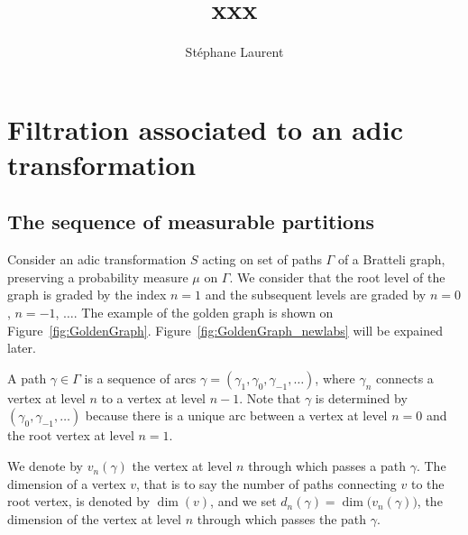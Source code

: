 \documentclass[12pt,a4paper]{article}
\author{Stéphane Laurent}
\title{xxx}
\begin{document}
\theoremstyle{defstyle}
\newtheorem{definition}{Definition}
\newtheorem{remark}{Remark}    
\theoremstyle{thmstyle}
\newtheorem{thm}{Theorem}[section]
\newtheorem{ppsition}{Proposition}
\newtheorem{lemma}{Lemma}

\newcommand{\FF}{\mathcal{F}}
\newcommand{\GG}{\mathcal{G}}
\newcommand{\EE}{\mathbb{E}}
\newcommand{\II}{\mathcal{I}}
\newcommand{\LL}{\mathcal{L}}
\newcommand{\OO}{\mathcal{O}}
\newcommand{\XX}{\mathcal{X}}
\newcommand{\given}{\mid}
\newcommand{\eps}{\epsilon}
\newcommand{\indic}{\boldsymbol 1}
\newcommand{\Vb}{\boldsymbol V}


\maketitle

\section{Filtration associated to an adic transformation} 

\subsection{The sequence of measurable partitions}

Consider an adic transformation $S$ acting on set of paths $\Gamma$ of a 
Bratteli graph, preserving a probability measure $\mu$ on $\Gamma$. 
We consider that the root level of the graph is graded by the index 
$n=1$ and the subsequent levels are graded by $n=0$, $n=-1$, $\ldots$. 
The example of the golden graph is shown on Figure~\ref{fig:GoldenGraph}. 
Figure~\ref{fig:GoldenGraph_newlabs} will be expained later.

A path $\gamma \in \Gamma$ is a sequence of arcs 
$\gamma=(\gamma_{1}, \gamma_0, \gamma_{-1}, \ldots)$, where $\gamma_n$ connects 
a vertex at level $n$ to a vertex at level $n-1$. 
Note that $\gamma$ is determined by $(\gamma_0, \gamma_{-1}, \ldots)$ 
because there is a unique arc between a vertex at level $n=0$ and the root vertex 
at level $n=1$.  

We denote by $v_n(\gamma)$ the vertex at level $n$ through which passes a path $\gamma$. 
The dimension of a vertex $v$, that is to say the number of paths connecting $v$ 
to the root vertex, is denoted by $\dim(v)$, and we set 
$\boxed{d_n(\gamma)=\dim\bigl(v_n(\gamma)\bigr)}$, the dimension of the vertex at level $n$ 
through which passes the path $\gamma$. 
\end{document}
